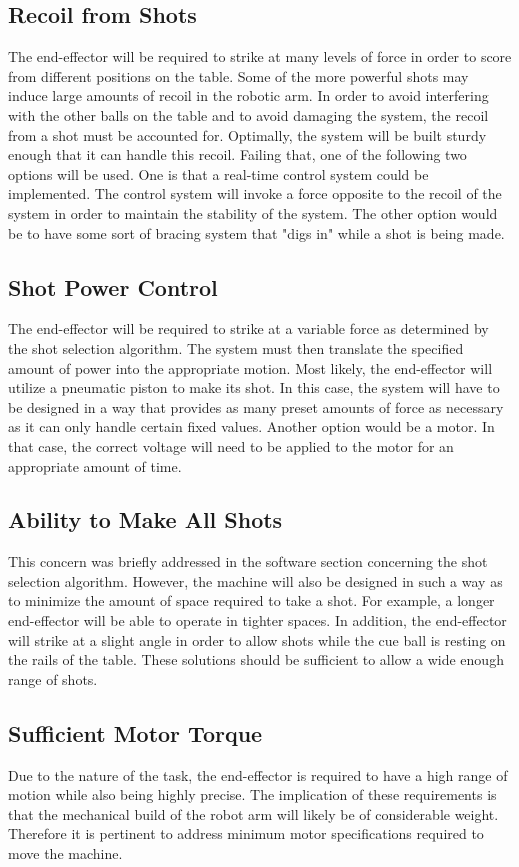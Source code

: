 \documentclass[titlepage]{article}
\begin{document}
\subsection{Recoil from Shots}
The end-effector will be required to strike at many levels of force in order to score from different positions on the table. Some of the more powerful shots may induce large amounts of recoil in the robotic arm. In order to avoid interfering with the other balls on the table and to avoid damaging the system, the recoil from a shot must be accounted for. Optimally, the system will be built sturdy enough that it can handle this recoil. Failing that, one of the following two options will be used. One is that a real-time control system could be implemented. The control system will invoke a force opposite to the recoil of the system in order to maintain the stability of the system. The other option would be to have some sort of bracing system that "digs in" while a shot is being made.
\subsection{Shot Power Control}
The end-effector will be required to strike at a variable force as determined by the shot selection algorithm. The system must then translate the specified amount of power into the appropriate motion. Most likely, the end-effector will utilize a pneumatic piston to make its shot. In this case, the system will have to be designed in a way that provides as many preset amounts of force as necessary as it can only handle certain fixed values. Another option would be a motor. In that case, the correct voltage will need to be applied to the motor for an appropriate amount of time.\\

\subsection{Ability to Make All Shots}
This concern was briefly addressed in the software section concerning the shot selection algorithm. However, the machine will also be designed in such a way as to minimize the amount of space required to take a shot. For example, a longer end-effector will be able to operate in tighter spaces. In addition, the end-effector will strike at a slight angle in order to allow shots while the cue ball is resting on the rails of the table. These solutions should be sufficient to allow a wide enough range of shots.

\subsection{Sufficient Motor Torque}
Due to the nature of the task, the end-effector is required to have a high range of motion while also being highly precise. The implication of these requirements is that the mechanical build of the robot arm will likely be of considerable weight. Therefore it is pertinent to address minimum motor specifications required to move the machine.\\
\end{document}
